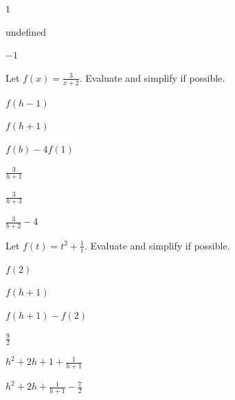 \begin{solution}

\begin{parts}
\item $1$ 
\item undefined
\item $-1$
\end{parts}
\end{solution}








\begin{exercise}
Let $\displaystyle f(x)=\frac{3}{x+2}$. Evaluate and simplify if possible. 


\begin{parts}
\item $f(h-1)$
\item $f(h+1)$
\item $f(b)-4f(1)$
\end{parts}
\end{exercise}


\begin{solution}

\begin{parts}
\item $\frac{3}{h+1}$ 
\item $\frac{3}{h+3}$
\item $\frac{3}{b+2}-4$
\end{parts}
\end{solution}





\begin{exercise}
Let $f(t)=t^2+\frac{1}{t}$. Evaluate and simplify if possible.


\begin{parts}
        \item  $f(2)$
        \item  $f(h+1)$
        \item  $f(h+1) - f(2)$
\end{parts}
\end{exercise}


\begin{solution}

\begin{parts}
\item $\frac{9}{2}$
\item $h^2+2h+1+\frac{1}{h+1}$
\item $h^2+2h+\frac{1}{h+1}-\frac{7}{2}$
\end{parts}
\end{solution}






